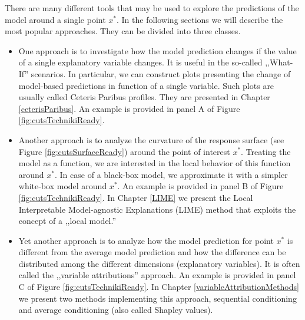 \documentclass[12pt,]{krantz}
\providecommand{\tightlist}{%
  \setlength{\itemsep}{0pt}\setlength{\parskip}{0pt}}
\theoremstyle{definition}
\theoremstyle{definition}
\theoremstyle{definition}
\theoremstyle{remark}
\begin{document}
There are many different tools that may be used to explore the
predictions of the model around a single point \(x^*\). In the following
sections we will describe the most popular approaches. They can be
divided into three classes.

\begin{itemize}
\tightlist
\item
  One approach is to investigate how the model prediction changes if the
  value of a single explanatory variable changes. It is useful in the
  so-called ,,What-If'' scenarios. In particular, we can construct plots
  presenting the change of model-based predictions in function of a
  single variable. Such plots are usually called Ceteris Paribus
  profiles. They are presented in Chapter \ref{ceterisParibus}. An
  example is provided in panel A of Figure \ref{fig:cutsTechnikiReady}.
\item
  Another approach is to analyze the curvature of the response surface
  (see Figure \ref{fig:cutsSurfaceReady}) around the point of interest
  \(x^*\). Treating the model as a function, we are interested in the
  local behavior of this function around \(x^*\). In case of a black-box
  model, we approximate it with a simpler white-box model around
  \(x^*\). An example is provided in panel B of Figure
  \ref{fig:cutsTechnikiReady}. In Chapter \ref{LIME} we present the
  Local Interpretable Model-agnostic Explanations (LIME) method that
  exploits the concept of a ,,local model.''
\item
  Yet another approach is to analyze how the model prediction for point
  \(x^*\) is different from the average model prediction and how the
  difference can be distributed among the different dimensions
  (explanatory variables). It is often called the ,,variable
  attributions'' approach. An example is provided in panel C of Figure
  \ref{fig:cutsTechnikiReady}. In Chapter
  \ref{variableAttributionMethods} we present two methods implementing
  this approach, sequential conditioning and average conditioning (also
  called Shapley values).
\end{itemize}
\end{document}
